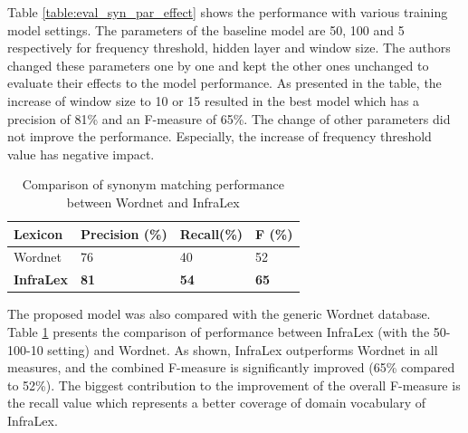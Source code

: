 \documentclass[Journal, BackFigs, DoubleSpace]{ascelike} %
\begin{document}
%
Table \ref{table:eval_syn_par_effect} shows the performance with various training model settings. The parameters of the baseline model are 50, 100 and 5 respectively for frequency threshold, hidden layer and window size. The authors changed these parameters one by one and kept the other ones unchanged to evaluate their effects to the model performance. As presented in the table, the increase of window size to 10 or 15 resulted in the best model which has a precision of 81\% and an F-measure of 65\%. The change of other parameters did not improve the performance. Especially, the increase of frequency threshold value has negative impact. 
%
\begin{table} [b] 
	\caption{Comparison of synonym matching performance between Wordnet and InfraLex}
	\label{table:eval_syn_vs_Wordnet}
	\centering
	\small
	\renewcommand{\arraystretch}{1.25}
	\begin{tabular}{l l l l }
		\hline
		\hline
		\textbf{Lexicon} & \textbf{Precision (\%)}  & \textbf{Recall(\%)} & \textbf{F (\%)}\\
		\hline
		Wordnet	&76 	&40 	&52\\	
		\textbf{InfraLex} &\textbf{81}	&\textbf{54}		&\textbf{65}\\	
		\hline
		\hline
	\end{tabular}
	\normalsize
\end{table}
\par
The proposed model was also compared with the generic Wordnet database. Table \ref{table:eval_syn_vs_Wordnet} presents the comparison of performance between InfraLex (with the 50-100-10 setting) and Wordnet. As shown, InfraLex outperforms Wordnet in all measures, and the combined F-measure is significantly improved (65\% compared to 52\%). The biggest contribution to the improvement of the overall F-measure is the recall value which represents a better coverage of domain vocabulary of InfraLex. 
\end{document}
